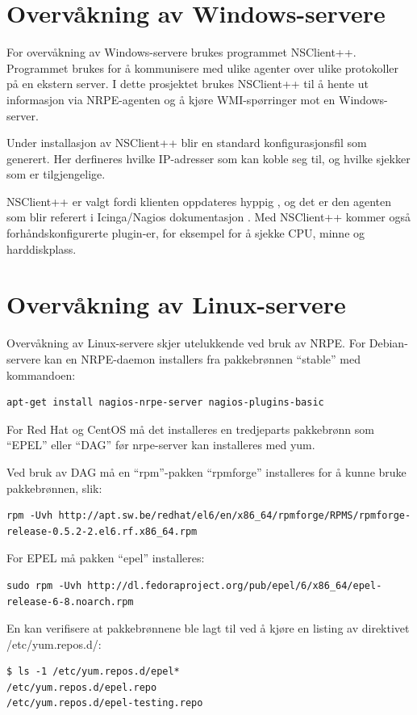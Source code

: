 \section{Overvåkning av Windows-servere}
For overvåkning av Windows-servere brukes programmet NSClient++\cite{nsclientmain}. Programmet brukes for å kommunisere med ulike agenter over ulike protokoller på en ekstern server. I dette prosjektet brukes NSClient++ til å hente ut informasjon via NRPE-agenten og å kjøre WMI-spørringer mot en Windows-server. 

Under installasjon av NSClient++ blir en standard konfigurasjonsfil som generert. Her derfineres hvilke IP-adresser som kan koble seg til, og hvilke sjekker som er tilgjengelige.

NSClient++ er valgt fordi klienten oppdateres hyppig \cite{nsclient}, og det er den agenten som blir referert i Icinga/Nagios dokumentasjon \cite{icingawin}. Med NSClient++ kommer også forhåndskonfigurerte plugin-er, for eksempel for å sjekke CPU, minne og harddiskplass.

\section{Overvåkning av Linux-servere}\label{sec:overvaklinux}
Overvåkning av Linux-servere skjer utelukkende ved bruk av NRPE. For Debian-servere kan en NRPE-daemon installers fra pakkebrønnen ``stable'' med kommandoen:
\begin{lstlisting}[style=example]
apt-get install nagios-nrpe-server nagios-plugins-basic
\end{lstlisting}

For Red Hat og CentOS må det installeres en tredjeparts pakkebrønn som ``EPEL'' eller ``DAG'' før nrpe-server kan installeres med yum.

Ved bruk av DAG må en ``rpm''-pakken ``rpmforge'' installeres for å kunne bruke pakkebrønnen, slik:
\begin{lstlisting}[style=example]
rpm -Uvh http://apt.sw.be/redhat/el6/en/x86_64/rpmforge/RPMS/rpmforge-release-0.5.2-2.el6.rf.x86_64.rpm
\end{lstlisting}

For EPEL må pakken ``epel'' installeres:
\begin{lstlisting}[style=example]
sudo rpm -Uvh http://dl.fedoraproject.org/pub/epel/6/x86_64/epel-release-6-8.noarch.rpm
\end{lstlisting}

En kan verifisere at pakkebrønnene ble lagt til ved å kjøre en listing av direktivet /etc/yum.repos.d/:
\begin{lstlisting}[style=example]
$ ls -1 /etc/yum.repos.d/epel*
/etc/yum.repos.d/epel.repo
/etc/yum.repos.d/epel-testing.repo
\end{lstlisting}

